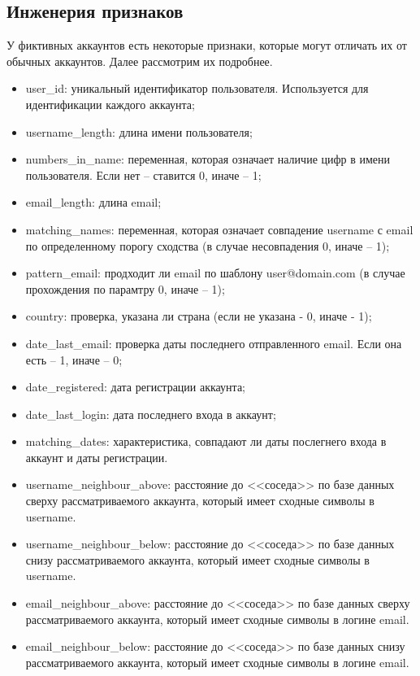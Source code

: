 \subsection{Инженерия признаков}
\label{subsec:Characteristics}
У фиктивных аккаунтов есть некоторые признаки, которые могут отличать их от обычных аккаунтов. Далее рассмотрим их подробнее.
\begin{itemize}
    \item user\_id: уникальный идентификатор пользователя. Используется для идентификации каждого аккаунта;
    \item username\_length: длина имени пользователя;
    \item numbers\_in\_name: переменная, которая означает наличие цифр в имени пользователя. Если нет – ставится 0, иначе – 1;
    \item email\_length: длина email;
    \item matching\_names: переменная, которая означает совпадение username с email по определенному порогу сходства (в случае несовпадения 0, иначе – 1);
    \item pattern\_email: продходит ли email по шаблону user@domain.com (в случае прохождения по парамтру 0, иначе – 1);
    \item country: проверка, указана ли страна (если не указана - 0, иначе - 1);
    \item date\_last\_email: проверка даты последнего отправленного email. Если она есть – 1, иначе – 0;
    \item date\_registered: дата регистрации аккаунта;
    \item date\_last\_login: дата последнего входа в аккаунт;
    \item matching\_dates: характеристика, совпадают ли даты послегнего входа в аккаунт и даты регистрации.
    \item username\_neighbour\_above: расстояние до <<соседа>> по базе данных сверху рассматриваемого аккаунта, который имеет сходные символы в username.
    \item username\_neighbour\_below: расстояние до <<соседа>> по базе данных снизу рассматриваемого аккаунта, который имеет сходные символы в username.
    \item email\_neighbour\_above: расстояние до <<соседа>> по базе данных сверху рассматриваемого аккаунта, который имеет сходные символы в логине email.
    \item email\_neighbour\_below: расстояние до <<соседа>> по базе данных снизу рассматриваемого аккаунта, который имеет сходные символы в логине email.
\end{itemize}

